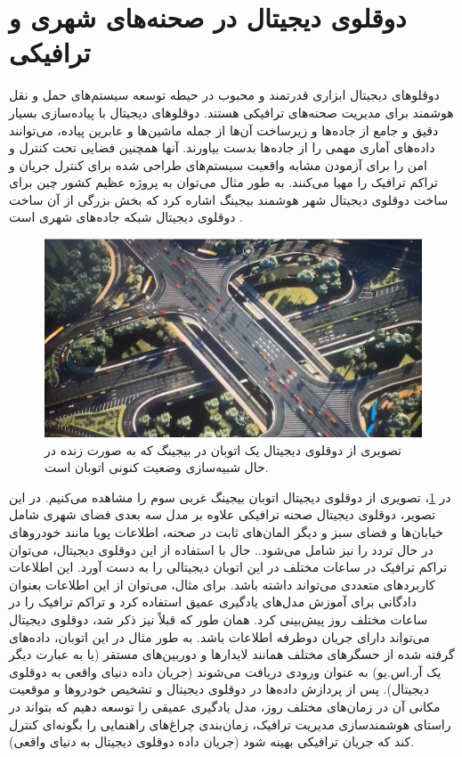 \section{دوقلوی دیجیتال در صحنه‌های شهری و ترافیکی}
دوقلو‌های دیجیتال ابزاری قدرتمند و محبوب در حیطه توسعه سیستم‌های حمل‌ و نقل هوشمند برای مدیریت صحنه‌های ترافیکی هستند. دوقلوهای دیجیتال با پیاده‌سازی بسیار دقیق و جامع از جاده‌ها و زیرساخت آن‌ها از جمله ماشین‌ها و عابرین پیاده، می‌توانند داده‌های آماری مهمی را از جاده‌ها بدست بیاورند. آنها همچنین فضایی تحت کنترل و امن را برای آزمودن مشابه واقعیت سیستم‌های طراحی شده برای کنترل جریان و تراکم ترافیک را مهیا می‌کنند. به طور مثال می‌توان به پروژه عظیم کشور چین برای ساخت دوقلوی دیجیتال شهر هوشمند بیجینگ اشاره کرد که بخش بزرگی از آن ساخت دوقلوی دیجیتال شبکه جاده‌های شهری است \cite{51World:2019}.

\begin{figure}[h]
	\centering
	\includegraphics[scale=0.45]{figures/traffic_scene_digital_twin.jpeg}
	\caption{ تصویری از دوقلوی دیجیتال یک اتوبان در بیجینگ که به صورت زنده در حال شبیه‌سازی وضعیت کنونی اتوبان‌ است. \cite{51World:2019}}
	\label{fig:beijing_traffic_scene_dt}
\end{figure}

در \cref{fig:beijing_traffic_scene_dt}، تصویری از دوقلوی دیجیتال اتوبان بیجینگ غربی سوم را مشاهده می‌کنیم. در این تصویر، دوقلوی دیجیتال صحنه ترافیکی علاوه بر مدل سه بعدی فضای شهری شامل خیابان‌ها و فضای سبز و دیگر المان‌های ثابت در صحنه، اطلاعات پویا مانند خودروهای در حال تردد را نیز شامل می‌شود.. حال با استفاده از این دوقلوی دیجیتال، می‌توان تراکم ترافیک در ساعات مختلف در این اتوبان دیجیتالی را به دست آورد. این اطلاعات کاربردهای متعددی می‌تواند داشته باشد. برای مثال، می‌توان از این اطلاعات بعنوان دادگانی برای آموزش مدل‌های یادگیری عمیق استفاده کرد و تراکم ترافیک را در ساعات مختلف روز پیش‌بینی کرد. همان‌ طور که قبلاً نیز ذکر شد، دوقلوی دیجیتال می‌تواند دارای جریان دوطرفه اطلاعات باشد. به طور مثال در این اتوبان، داده‌های گرفته شده از حسگرهای مختلف همانند لایدارها و دوربین‌های مستقر (یا به عبارت دیگر یک آر.اس.یو) به عنوان ورودی دریافت می‌شوند (جریان داده دنیای واقعی به دوقلوی دیجیتال). پس از پردازش داده‌ها در دوقلوی دیجیتال و تشخیص خودروها و موقعیت مکانی آن در زمان‌های مختلف روز، مدل یادگیری عمیقی را توسعه دهیم که بتواند در راستای هوشمندسازی مدیریت ترافیک، زمان‌بندی چراغ‌های راهنمایی را بگونه‌ای کنترل کند که جریان ترافیکی بهینه شود (جریان داده‌ دوقلوی دیجیتال به دنیای واقعی).

